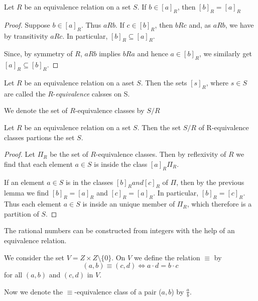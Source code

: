 \begin{lemma}
    Let $R$ be an equivalence relation on a set $S$. If $b\in \left[a\right]_R$, then $ \left[b\right]_R = \left[a\right]_R$
\end{lemma}
\begin{proof}[Proof]
    Suppose $ b \in \left[a\right]_R $. Thus $aRb$. If $ c \in \left[b\right]_R $, then $bRc$ and, as $aRb$, we have by transitivity $aRc$.
    In particular, $ [b]_R \subseteq [a]_R $.\par
    Since, by symmetry of $R$, $aRb$ implies $bRa$ and hence $a \in [b]_R$, we similarly get $ [a]_R \subseteq [b]_R $.
\end{proof}

\begin{definition}
    Let $R$ be an equivalence relation on a aset $S$. Then the sets $ [s]_R $, where $ s \in S $ are called the $R$-\emph{equivalence} calsses on S. \par
    We denote the set of $R$-equivalence classes by $ S/R $
\end{definition}


\begin{theorem}
    Let $R$ be an equivalence relation on a set $S$. Then the set $S/R$ of R-equivalence classes partions the set $S$.
\end{theorem}
\begin{proof}[Proof]
    Let $ \Pi_R $ be the set of $R$-equivalence classes. Then by reflexivity of $R$ we find that each element $ a \in S $
    is inside the class $ \left[a\right]_R \Pi_R $.

    If an element $ a \in S $ is in the classes $ \left[b\right]_R and \left[c\right]_R $ of $ \Pi $, then by the previous lemma
    we find $ \left[b\right]_R = \left[a\right]_R $ and $ \left[c\right]_R = \left[a\right]_R $. In particular, $ \left[b\right]_R = \left[c\right]_R $.
    Thus each element $ a \in S $ is inside an unique member of $ \Pi_R $, which therefore is a partition of $S$.
\end{proof}

\begin{example}
    The rational numbers can be constructed from integers with the help of an equivalence relation.

    We consider the set $V = Z \times Z \setminus \{0\}$. On $V$ we define the relation $\equiv$ by
    $$ (a,b) \equiv (c,d) \iff a \cdot d = b \cdot c $$
    for all $ (a,b) $ and $ (c,d) $ in $V$.

    Now we denote the $ \equiv $-equivalence class of a pair ($a,b$) by $ \frac{a}{b} $.
\end{example}


